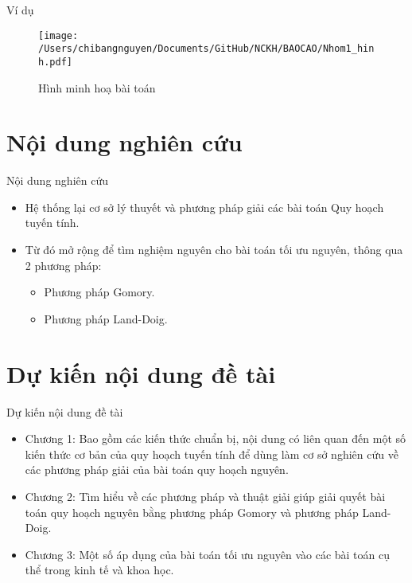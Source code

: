\documentclass{beamer}
\begin{document}
\begin{frame}{Ví dụ}
    \begin{center}
        \begin{figure}[ht]
            \begin{center}

            \texttt{[image: /Users/chibangnguyen/Documents/GitHub/NCKH/BAOCAO/Nhom1\_hinh.pdf]}
            
            Hình minh hoạ bài toán
            \end{center}
      \end{figure}
      \end{center}
\end{frame}
\section{Nội dung nghiên cứu}
\begin{frame}{Nội dung nghiên cứu}
    \begin{itemize}
    \item Hệ thống lại cơ sở lý thuyết và phương pháp giải các bài toán Quy hoạch tuyến tính.
    \item Từ đó mở rộng để tìm nghiệm nguyên cho bài toán tối ưu nguyên, thông qua 2 phương pháp:
    \begin{itemize}
    \item Phương pháp Gomory.
    \item Phương pháp Land-Doig.
    \end{itemize}
    \end{itemize}
\end{frame}
\section{Dự kiến nội dung đề tài}
\begin{frame}{Dự kiến nội dung đề tài}
    \begin{itemize}
    \item Chương 1:  Bao gồm các kiến thức chuẩn bị, nội dung có liên quan đến
    một số kiến thức cơ bản của quy hoạch tuyến tính để dùng
    làm cơ sở nghiên cứu về các phương pháp giải của bài toán quy hoạch nguyên.
    \item Chương 2: Tìm hiểu về các phương pháp và thuật giải giúp giải quyết bài toán quy hoạch nguyên bằng phương pháp Gomory và phương pháp Land-Doig.
    \item Chương 3: Một số áp dụng của bài toán tối ưu nguyên vào các bài toán cụ thể trong kinh tế và khoa học.
    \end{itemize}   
\end{frame}
\end{document}
